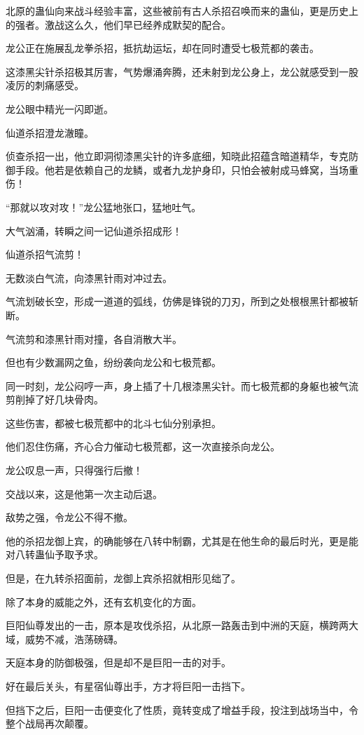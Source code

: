 \begin{this_body}
北原的蛊仙向来战斗经验丰富，这些被前有古人杀招召唤而来的蛊仙，更是历史上的强者。激战这么久，他们早已经养成默契的配合。

龙公正在施展乱龙拳杀招，抵抗劫运坛，却在同时遭受七极荒都的袭击。

这漆黑尖针杀招极其厉害，气势爆涌奔腾，还未射到龙公身上，龙公就感受到一股凌厉的刺痛感受。

龙公眼中精光一闪即逝。

仙道杀招澄龙澈瞳。

侦查杀招一出，他立即洞彻漆黑尖针的许多底细，知晓此招蕴含暗道精华，专克防御手段。他若是依赖自己的龙鳞，或者九龙护身印，只怕会被射成马蜂窝，当场重伤！

“那就以攻对攻！”龙公猛地张口，猛地吐气。

大气汹涌，转瞬之间一记仙道杀招成形！

仙道杀招气流剪！

无数淡白气流，向漆黑针雨对冲过去。

气流划破长空，形成一道道的弧线，仿佛是锋锐的刀刃，所到之处根根黑针都被斩断。

气流剪和漆黑针雨对撞，各自消散大半。

但也有少数漏网之鱼，纷纷袭向龙公和七极荒都。

同一时刻，龙公闷哼一声，身上插了十几根漆黑尖针。而七极荒都的身躯也被气流剪削掉了好几块骨肉。

这些伤害，都被七极荒都中的北斗七仙分别承担。

他们忍住伤痛，齐心合力催动七极荒都，这一次直接杀向龙公。

龙公叹息一声，只得强行后撤！

交战以来，这是他第一次主动后退。

敌势之强，令龙公不得不撤。

他的杀招龙御上宾，的确能够在八转中制霸，尤其是在他生命的最后时光，更是能对八转蛊仙予取予求。

但是，在九转杀招面前，龙御上宾杀招就相形见绌了。

除了本身的威能之外，还有玄机变化的方面。

巨阳仙尊发出的一击，原本是攻伐杀招，从北原一路轰击到中洲的天庭，横跨两大域，威势不减，浩荡磅礴。

天庭本身的防御极强，但是却不是巨阳一击的对手。

好在最后关头，有星宿仙尊出手，方才将巨阳一击挡下。

但挡下之后，巨阳一击便变化了性质，竟转变成了增益手段，投注到战场当中，令整个战局再次颠覆。


\end{this_body}
